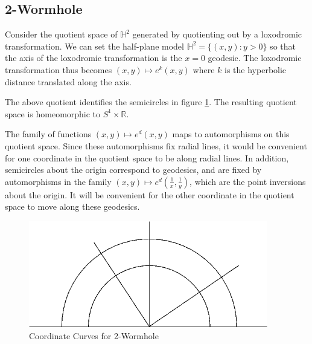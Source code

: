 \subsection{2-Wormhole}


Consider the quotient space of $\mathbb{H}^2$ generated by quotienting out by a loxodromic transformation. We can set the half-plane model $\mathbb{H}^2 = \{(x,y):y>0\}$ so that the axis of the loxodromic transformation is the $x=0$ geodesic. The loxodromic transformation thus becomes $(x,y) \mapsto e^k(x,y)$ where $k$ is the hyperbolic distance translated along the axis.


The above quotient identifies the semicircles in figure \ref{fig:coordinatecurves}. The resulting quotient space is homeomorphic to $S^1 \times \mathbb{R}$.


The family of functions $(x,y) \mapsto e^d(x,y)$ maps to automorphisms on this quotient space. Since these automorphisms fix radial lines, it would be convenient for one coordinate in the quotient space to be along radial lines. In addition, semicircles about the origin correspond to geodesics, and are fixed by automorphisms in the family $(x,y) \mapsto e^d\left(\frac{1}{x},\frac{1}{y}\right)$, which are the point inversions about the origin. It will be convenient for the other coordinate in the quotient space to move along these geodesics.

\begin{figure}[h]
\includegraphics[scale=0.5]{../images/RadialLines.png}
\caption{Coordinate Curves for 2-Wormhole}
\label{fig:coordinatecurves}
\end{figure}

